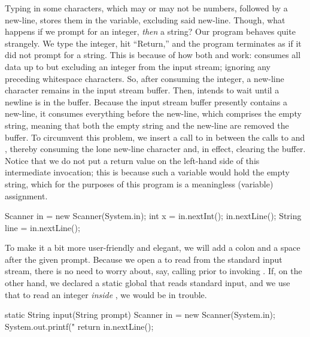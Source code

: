 Typing in some characters, which may or may not be numbers, followed by a new-line, stores them in the  variable, excluding said new-line. 
Though, what happens if we prompt for an integer, \emph{then} a string? 
Our program behaves quite strangely. 
We type the integer, hit ``Return,'' and the program terminates as if it did not prompt for a string. 
This is because of how both  and  work:  consumes all data up to but excluding an integer from the input stream; ignoring any preceding whitespace characters. 
So, after consuming the integer, a new-line character remains in the input stream buffer. 
Then,  intends to wait until a newline is in the buffer. 
Because the input stream buffer presently contains a new-line, it consumes everything before the new-line, which comprises the empty string, meaning that both the empty string and the new-line are removed the buffer. 
To circumvent this problem, we insert a call to  in between the calls to  and , thereby consuming the lone new-line character and, in effect, clearing the buffer. 
Notice that we do not put a return value on the left-hand side of this intermediate  invocation; this is because such a variable would hold the empty string, which for the purposes of this program is a meaningless (variable) assignment.

\begin{verbnobox}[\small]
Scanner in = new Scanner(System.in);
int x = in.nextInt();
in.nextLine();
String line = in.nextLine();
\end{verbnobox}

To make it a bit more user-friendly and elegant, we will add a colon and a space after the given prompt. 
Because we open a  to read from the standard input stream, there is no need to worry about, say, calling  prior to invoking .
If, on the other hand, we declared a static global  that reads standard input, and we use that to read an integer \emph{inside} , we would be in trouble. 

\begin{verbnobox}[\small]
static String input(String prompt) {
  Scanner in = new Scanner(System.in);
  System.out.printf("%
  return in.nextLine();
}
\end{verbnobox}

